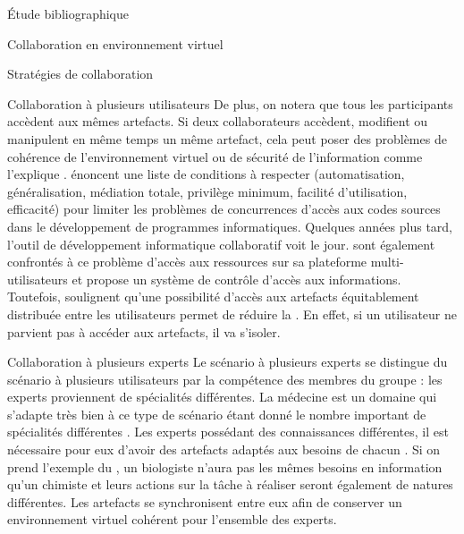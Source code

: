 \documentclass[myfrancais,ngerman,english,frenchb]{mythesis}
\begin{document}
\begin{mychapter}{Étude bibliographique}
\begin{mysection}{Collaboration en environnement virtuel}
\begin{mysubsection}{Stratégies de collaboration}
\begin{mysubsubsection}{Collaboration à plusieurs utilisateurs}
					De plus, on notera que tous les participants accèdent aux mêmes artefacts.
					Si deux collaborateurs accèdent, modifient ou manipulent en même temps un même artefact, cela peut poser des problèmes de cohérence de l'environnement virtuel ou de sécurité de l'information comme l'explique .
					 énoncent une liste de conditions à respecter (automatisation, généralisation, médiation totale, privilège minimum, facilité d'utilisation, efficacité) pour limiter les problèmes de concurrences d'accès aux codes sources dans le développement de programmes informatiques.
					Quelques années plus tard, l'outil de développement informatique collaboratif  voit le jour.
					 sont également confrontés à ce problème d'accès aux ressources sur sa plateforme multi-utilisateurs \myMARE et propose un système de contrôle d'accès aux informations.
					Toutefois,  soulignent qu'une possibilité d'accès aux artefacts équitablement distribuée entre les utilisateurs permet de réduire la .
					En effet, si un utilisateur ne parvient pas à accéder aux artefacts, il va s'isoler.
				\end{mysubsubsection}
				\begin{mysubsubsection}{Collaboration à plusieurs experts}
					Le scénario à plusieurs experts se distingue du scénario à plusieurs utilisateurs par la compétence des membres du groupe : les experts proviennent de spécialités différentes.
					La médecine est un domaine qui s'adapte très bien à ce type de scénario étant donné le nombre important de spécialités différentes .
					Les experts possédant des connaissances différentes, il est nécessaire pour eux d'avoir des artefacts adaptés aux besoins de chacun .
					Si on prend l'exemple du , un biologiste n'aura pas les mêmes besoins en information qu'un chimiste et leurs actions sur la tâche à réaliser seront également de natures différentes.
					Les artefacts se synchronisent entre eux afin de conserver un environnement virtuel cohérent pour l'ensemble des experts.


\end{mysubsubsection}
\end{mysubsection}
\end{mysection}
\end{mychapter}
\end{document}
